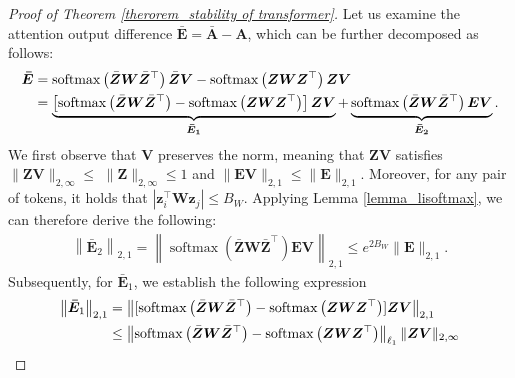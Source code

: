 \begin{proof}[Proof of Theorem \ref{therorem_stability of transformer}]
Let us examine the attention output difference $\bar{\boldsymbol{E}}=\bar{\boldsymbol{A}}-\boldsymbol{A}$, which can be further decomposed as follows:
\begin{align}
\boldsymbol{\bar{E}}&=\operatorname{softmax}\left(\bar{\boldsymbol{Z}} \boldsymbol{W} \bar{\boldsymbol{Z}}^{\top}\right) \bar{\boldsymbol{Z}} \boldsymbol{V}-\operatorname{softmax}\left(\boldsymbol{Z} \boldsymbol{W} \boldsymbol{Z}^{\top}\right) \boldsymbol{Z} \boldsymbol{V} \notag \\
&=\underbrace{\left[\operatorname{softmax}\left(\bar{\boldsymbol{Z}} \boldsymbol{W} \bar{\boldsymbol{Z}}^{\top}\right)-\operatorname{softmax}\left(\boldsymbol{Z} \boldsymbol{W} \boldsymbol{Z}^{\top}\right)\right] \boldsymbol{Z} \boldsymbol{V}}_{\boldsymbol{\bar{E}_1}}+\underbrace{\operatorname{softmax}\left(\bar{\boldsymbol{Z}} \boldsymbol{W} \bar{\boldsymbol{Z}}^{\top}\right) \boldsymbol{E} \boldsymbol{V}}_{\boldsymbol{\bar{E}_2}} .\label{proof_edecomp}
\end{align}
We first observe that $\boldsymbol{V}$ preserves the norm, meaning that $\boldsymbol{Z} \boldsymbol{V}$ satisfies $\|\boldsymbol{Z} \boldsymbol{V}\|_{2, \infty} \leq$ $\|\boldsymbol{Z}\|_{2, \infty} \leq 1$ and $\|\boldsymbol{E} \boldsymbol{V}\|_{2,1} \leq\|\boldsymbol{E}\|_{2,1}$. Moreover, for any pair of tokens, it holds that $\left|\boldsymbol{z}_i^{\top} \boldsymbol{W} \boldsymbol{z}_j\right| \leq B_W$. Applying Lemma \ref{lemma_lisoftmax}, we can therefore derive the following:
\begin{align}
\left\|\boldsymbol{\bar{E}}_2\right\|_{2,1}=\left\|\operatorname{softmax}\left(\bar{\boldsymbol{Z}} \boldsymbol{W} \bar{\boldsymbol{Z}}^{\top}\right) \boldsymbol{E} \boldsymbol{V}\right\|_{2,1} \leq e^{2 B_W}\|\boldsymbol{E}\|_{2,1} .\label{proof_e1}
\end{align}
Subsequently, for $\boldsymbol{\bar{E}}_1$, we establish the following expression
\begin{align}
\left\|\boldsymbol{\bar{E}}_1\right\|_{2,1} &= \left\|[\operatorname{softmax}\left(\bar{\boldsymbol{Z}} \boldsymbol{W} \bar{\boldsymbol{Z}}^{\top}\right)-\operatorname{softmax}\left(\boldsymbol{Z} \boldsymbol{W} \boldsymbol{Z}^{\top}\right)]\boldsymbol{Z} \boldsymbol{V}\right\|_{2,1} \notag \\
& \leq\left\|\operatorname{softmax}\left(\bar{\boldsymbol{Z}} \boldsymbol{W} \bar{\boldsymbol{Z}}^{\top}\right)-\operatorname{softmax}\left(\boldsymbol{Z} \boldsymbol{W} \boldsymbol{Z}^{\top}\right)\right\|_{\ell_1}\|\boldsymbol{Z} \boldsymbol{V}\|_{2, \infty}\notag \\

\end{align}
\end{proof}
